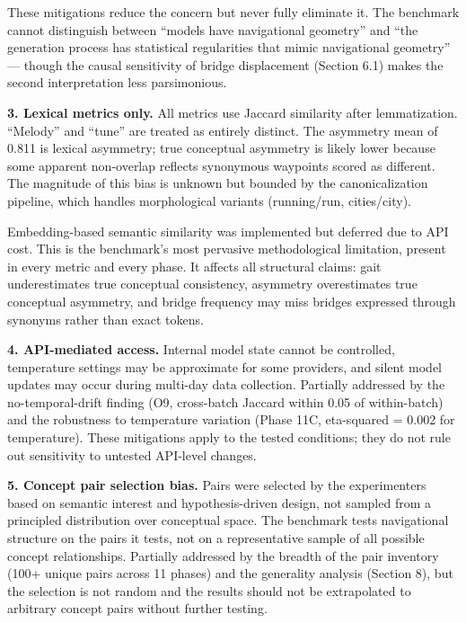 These mitigations reduce the concern but never fully eliminate it. The benchmark cannot distinguish between ``models have navigational geometry'' and ``the generation process has statistical regularities that mimic navigational geometry'' --- though the causal sensitivity of bridge displacement (Section 6.1) makes the second interpretation less parsimonious.

\textbf{3. Lexical metrics only.} All metrics use Jaccard similarity after lemmatization. ``Melody'' and ``tune'' are treated as entirely distinct. The asymmetry mean of 0.811 is lexical asymmetry; true conceptual asymmetry is likely lower because some apparent non-overlap reflects synonymous waypoints scored as different. The magnitude of this bias is unknown but bounded by the canonicalization pipeline, which handles morphological variants (running/run, cities/city).

Embedding-based semantic similarity was implemented but deferred due to API cost. This is the benchmark's most pervasive methodological limitation, present in every metric and every phase. It affects all structural claims: gait underestimates true conceptual consistency, asymmetry overestimates true conceptual asymmetry, and bridge frequency may miss bridges expressed through synonyms rather than exact tokens.

\textbf{4. API-mediated access.} Internal model state cannot be controlled, temperature settings may be approximate for some providers, and silent model updates may occur during multi-day data collection. Partially addressed by the no-temporal-drift finding (O9, cross-batch Jaccard within 0.05 of within-batch) and the robustness to temperature variation (Phase 11C, eta-squared = 0.002 for temperature). These mitigations apply to the tested conditions; they do not rule out sensitivity to untested API-level changes.

\textbf{5. Concept pair selection bias.} Pairs were selected by the experimenters based on semantic interest and hypothesis-driven design, not sampled from a principled distribution over conceptual space. The benchmark tests navigational structure on the pairs it tests, not on a representative sample of all possible concept relationships. Partially addressed by the breadth of the pair inventory (100+ unique pairs across 11 phases) and the generality analysis (Section 8), but the selection is not random and the results should not be extrapolated to arbitrary concept pairs without further testing.

